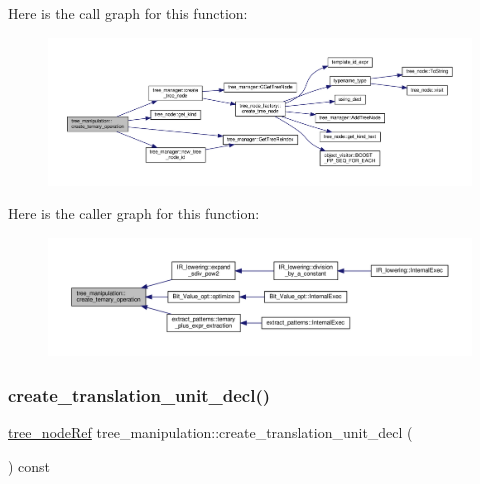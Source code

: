 Here is the call graph for this function\+:
\nopagebreak
\begin{figure}[H]
\begin{center}
\leavevmode
\includegraphics[width=350pt]{d0/d99/classtree__manipulation_a58fb7eaf45317b4fc556b8b4fefd45fd_cgraph}
\end{center}
\end{figure}
Here is the caller graph for this function\+:
\nopagebreak
\begin{figure}[H]
\begin{center}
\leavevmode
\includegraphics[width=350pt]{d0/d99/classtree__manipulation_a58fb7eaf45317b4fc556b8b4fefd45fd_icgraph}
\end{center}
\end{figure}
\mbox{\label{classtree__manipulation_ae4e9b96f56a35d0d75db91cc8acd16ad}} 
\subsubsection{\texorpdfstring{create\+\_\+translation\+\_\+unit\+\_\+decl()}{create\_translation\_unit\_decl()}}
{\footnotesize\ttfamily \hyperlink{tree__node_8hpp_a6ee377554d1c4871ad66a337eaa67fd5}{tree\+\_\+node\+Ref} tree\+\_\+manipulation\+::create\+\_\+translation\+\_\+unit\+\_\+decl (\begin{DoxyParamCaption}{ }\end{DoxyParamCaption}) const}




